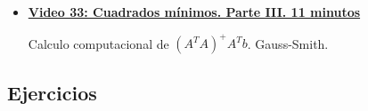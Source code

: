 \documentclass[12pt,a4paper]{article}
\newcommand\1{\mbox{\,\vrule height-0.8pt depth1.0pt width2pc\,}}
\newcommand\2{\mbox{\,\vrule height-0.8pt depth1.0pt width1pc\,}}
\begin{document}
\begin{itemize}
    
    Definici\'on: inversa generalizada de Penrose de una matriz cualquiera. Si $A=U \Sigma V^T$ entocnes $A^+=U \Sigma^{+} V^T$. Donde $\Sigma^{+}$ es igual a $\Sigma$ excepto los que no son 0 que se sustituyen por su inverso multiplicativo. Es la unica que cumple las 4 propiedades.
    
    Probamos que $x= (A^T A)^+ A^T b$ es soluci\'on de $A^T A x=A^T b$ y cualquier solucion de de minimo es de la forma $(A^T A)^+ A^T b + N(A)$. Esto sale de que $N(A^TA)=N(A)$. Ademas
    la solucion $x=(A^TA)^+ A^T b$ es ortogonal al $N(A)$ y asi es la solucion de minima longitud. 
    
      
    \item      \href{https://youtu.be/-hOpqfUR_lw}{\bf Video 33: Cuadrados m\'inimos. Parte III. 11 minutos }    
    
    Calculo computacional de $(A^TA)^+ A^T b$. Gauss-Smith.
      
      
\end{itemize}

\subsection*{Ejercicios}
\end{document}
